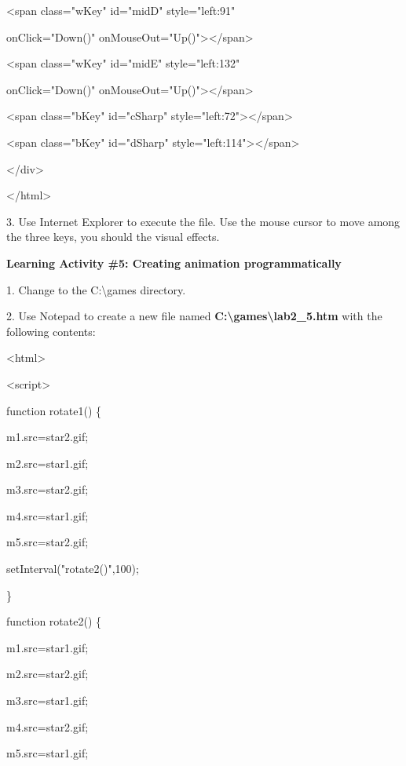 \documentclass[
]{article}
\begin{document}
\textless span class="wKey" id="midD" style="left:91"

onClick="Down()"
onMouseOut="Up()"\textgreater\textless/span\textgreater{}

\textless span class="wKey" id="midE" style="left:132"

onClick="Down()"
onMouseOut="Up()"\textgreater\textless/span\textgreater{}

\textless span class="bKey" id="cSharp"
style="left:72"\textgreater\textless/span\textgreater{}

\textless span class="bKey" id="dSharp"
style="left:114"\textgreater\textless/span\textgreater{}

\textless/div\textgreater{}

\textless/html\textgreater{}

3. Use Internet Explorer to execute the file. Use the mouse cursor to
move among the three keys, you should the visual effects.

\textbf{Learning Activity \#5: Creating animation programmatically}

1. Change to the C:\textbackslash games directory.

2. Use Notepad to create a new file named
\textbf{C:\textbackslash games\textbackslash lab2\_5.htm} with the
following contents:

\textless html\textgreater{}

\textless script\textgreater{}

function rotate1() \{

m1.src=\textquotesingle star2.gif\textquotesingle;

m2.src=\textquotesingle star1.gif\textquotesingle;

m3.src=\textquotesingle star2.gif\textquotesingle;

m4.src=\textquotesingle star1.gif\textquotesingle;

m5.src=\textquotesingle star2.gif\textquotesingle;

setInterval("rotate2()",100);

\}

function rotate2() \{

m1.src=\textquotesingle star1.gif\textquotesingle;

m2.src=\textquotesingle star2.gif\textquotesingle;

m3.src=\textquotesingle star1.gif\textquotesingle;

m4.src=\textquotesingle star2.gif\textquotesingle;

m5.src=\textquotesingle star1.gif\textquotesingle;
\end{document}
